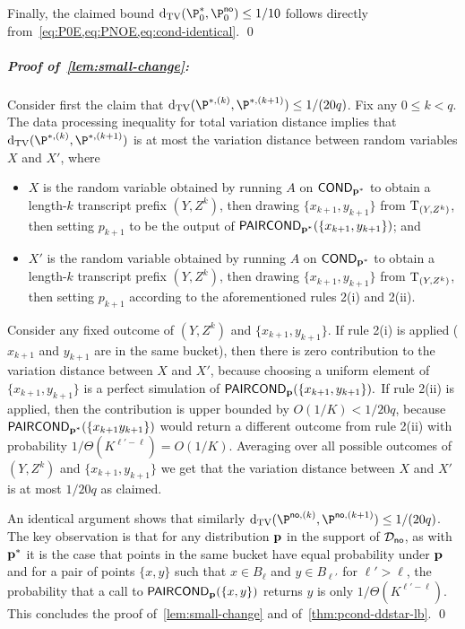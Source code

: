 Finally, the claimed bound
$\dtv(\P^\ast_0, \P^{\text \no}_0) \leq 1/10$
follows directly from~\cref{eq:P0E,eq:PNOE,eq:cond-identical}.
\qed

\subparagraph{Proof of~\cref{lem:small-change}:}
Consider first the claim that $\dtv(\P^{\ast,(k)},\P^{\ast, (k+1)})
\leq 1/(20q)$.  Fix any $0 \leq k < q$.
The data processing inequality for total variation distance implies that
$\dtv(\P^{\ast,(k)},\P^{\ast, (k+1)})$
is at most the variation distance between random variables $X$ and $X'$,
where
\begin{itemize}

\item $X$ is the random variable obtained by running $A$ on ${\sf COND}_{\mathbf{p}^\ast}$
to obtain a length-$k$ transcript prefix
$(Y,Z^k)$, then drawing $\{x_{k+1},y_{k+1}\}$
from ${\rm T}_{(Y,Z^k)}$, then setting $p_{k+1}$ to be the output
of ${\sf PAIRCOND}_{\mathbf{p}^\ast}(\{x_{k+1},y_{k+1}\})$; and

\item $X'$ is the random variable obtained by running $A$ on ${\sf COND}_{\mathbf{p}^\ast}$
to obtain a length-$k$ transcript prefix
$(Y,Z^k)$, then drawing $\{x_{k+1},y_{k+1}\}$
from ${\rm T}_{(Y,Z^k)}$, then setting $p_{k+1}$ according to the aforementioned rules 2(i) and 2(ii).
\end{itemize}

Consider any fixed outcome of $(Y,Z^k)$ and $\{x_{k+1},y_{k+1}\}.$
If rule 2(i) is applied ($x_{k+1}$ and $y_{k+1}$ are in the same bucket),
then there is
zero contribution to the variation distance between $X$ and $X'$,
because choosing a uniform element of $\{x_{k+1},y_{k+1}\}$ is a
perfect simulation of ${\sf PAIRCOND}_{\mathbf{p}}(\{x_{k+1},y_{k+1}\}).$
If rule 2(ii) is applied, then the contribution is upper bounded by $O(1/K)
< 1/20q$, because
${\sf PAIRCOND}_{\mathbf{p}^\ast}(\{x_{k+1}y_{k+1}\})$ would return a different
outcome from rule 2(ii) with probability $1/\Theta(K^{\ell'-\ell}) =
O(1/K).$  Averaging over all possible outcomes
of $(Y,Z^k)$ and $\{x_{k+1},y_{k+1}\}$ we get that the variation distance
between $X$ and $X'$ is at most $1/20q$ as claimed.

An identical argument shows that similarly
$\dtv(\P^{\text \no,(k)},\P^{\text \no, (k+1)}) \leq 1/(20q)$.
The key observation is that for any distribution $\mathbf{p}$
in the support of $\mathcal{D}_{\textsf{no}}$,
as with $\mathbf{p}^\ast$ it is the case that points in the same
bucket have equal probability under $\mathbf{p}$ and for a pair of points $\{x,y\}$ such that $x\in B_\ell$
and $y \in B_{\ell'}$ for $\ell' > \ell$, the probability that
 a call to ${\sf PAIRCOND}_{\mathbf{p}}(\{x,y\})$ returns $y$ is
 only $1/\Theta(K^{\ell'-\ell})$. 
This concludes the proof of~\cref{lem:small-change} and of~\cref{thm:pcond-ddstar-lb}.
\qed

